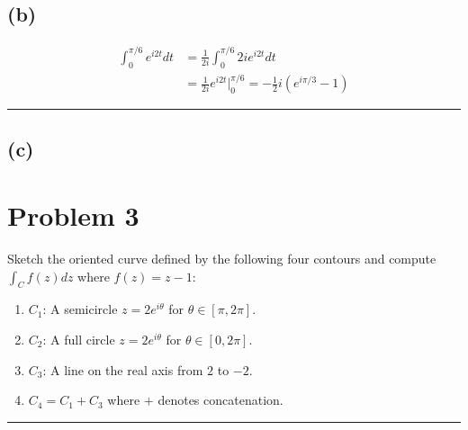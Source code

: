 \documentclass{article}
\begin{document}
\subsection*{(b)}
\begin{align*}
  \int_0^{\pi/6} e^{i2t}dt &= \frac{1}{2i}\int_0^{\pi/6} 2ie^{i2t}dt \\
  &= \frac{1}{2i} e^{i2t}|_0^{\pi/6} = -\frac{1}{2}i(e^{i\pi/3} - 1)
\end{align*}
\hrule
\subsection*{(c)}
\newpage
\section*{Problem 3}
Sketch the oriented curve defined by the following four contours and compute $\int_{C}f(z) dz$ where $f (z) = z-1$:
\begin{enumerate}
\item $C_1$: A semicircle $z=2e^{i\theta}$ for $\theta\in [\pi, 2\pi]$.
\item $C_2$: A full circle $z=2e^{i\theta}$  for $\theta\in [0, 2\pi]$.
\item $C_3$: A line on the real axis from $2$ to $-2$.
\item $C_4 = C_1+C_3$ where $+$ denotes concatenation.
\end{enumerate}

\vspace{.5cm} %

\hrule

\end{document}
